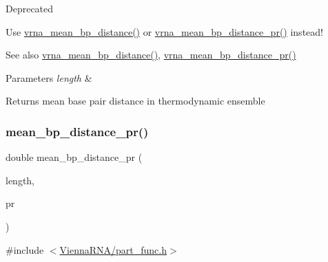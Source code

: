 \begin{DoxyRefDesc}{Deprecated}
\item[\hyperlink{deprecated__deprecated000107}{Deprecated}]Use \hyperlink{group__pf__fold_gaa6b8983b559b9ef4b2e1b31113ea317b}{vrna\+\_\+mean\+\_\+bp\+\_\+distance()} or \hyperlink{group__pf__fold_gad3f0c240512e6d43e2e4d4c2076021f5}{vrna\+\_\+mean\+\_\+bp\+\_\+distance\+\_\+pr()} instead! \end{DoxyRefDesc}
\begin{DoxySeeAlso}{See also}
\hyperlink{group__pf__fold_gaa6b8983b559b9ef4b2e1b31113ea317b}{vrna\+\_\+mean\+\_\+bp\+\_\+distance()}, \hyperlink{group__pf__fold_gad3f0c240512e6d43e2e4d4c2076021f5}{vrna\+\_\+mean\+\_\+bp\+\_\+distance\+\_\+pr()}
\end{DoxySeeAlso}

\begin{DoxyParams}{Parameters}
{\em length} & \\
\hline
\end{DoxyParams}
\begin{DoxyReturn}{Returns}
mean base pair distance in thermodynamic ensemble 
\end{DoxyReturn}
\mbox{\label{group__pf__fold_gad5ba36cef8d01cf4244cc09b9bf1ce1d}} 
\subsubsection{\texorpdfstring{mean\+\_\+bp\+\_\+distance\+\_\+pr()}{mean\_bp\_distance\_pr()}}
{\footnotesize\ttfamily double mean\+\_\+bp\+\_\+distance\+\_\+pr (\begin{DoxyParamCaption}\item[{int}]{length,  }\item[{\hyperlink{group__data__structures_ga31125aeace516926bf7f251f759b6126}{F\+L\+T\+\_\+\+O\+R\+\_\+\+D\+BL} $\ast$}]{pr }\end{DoxyParamCaption})}



{\ttfamily \#include $<$\hyperlink{part__func_8h}{Vienna\+R\+N\+A/part\+\_\+func.\+h}$>$}



